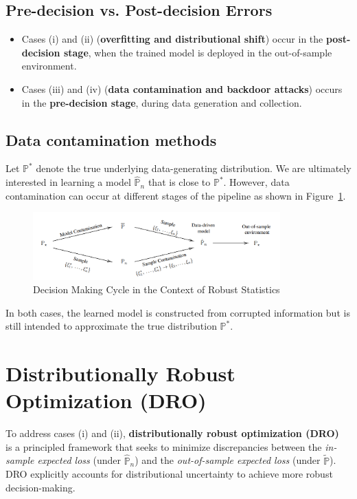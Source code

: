 \documentclass[11pt]{report}
\begin{document}
\subsection{Pre-decision vs. Post-decision Errors}
\begin{itemize}[left=1em]
    \item Cases (i) and (ii) (\textbf{overfitting and distributional shift}) occur in the \textbf{post-decision stage}, when the trained model is deployed in the out-of-sample environment.
    \item Cases (iii) and (iv) (\textbf{data contamination and backdoor attacks}) occurs in the \textbf{pre-decision stage}, during data generation and collection.
\end{itemize}

\subsection{Data contamination methods}
Let $\mathbb{P}^*$ denote the true underlying data-generating distribution. We are ultimately interested in learning a model $\hat{\mathbb{P}}_n$ that is close to $\mathbb{P}^*$. However, data contamination can occur at different stages of the pipeline as shown in Figure~\ref{fig2}.
\begin{figure}[h]
    \centering
    \includegraphics[width=0.85\textwidth]{images/img2.png}
    \caption{Decision Making Cycle in the Context of Robust Statistics}
    \label{fig2}
\end{figure}
In both cases, the learned model is constructed from corrupted information but is still intended to approximate the true distribution $\mathbb{P}^*$.

\section{Distributionally Robust Optimization (DRO)}
To address cases (i) and (ii), \textbf{distributionally robust optimization (DRO)}~\cite{rahimian2019distributionally} is a principled framework that seeks to minimize discrepancies between the \textit{in-sample expected loss} (under $\hat{\mathbb{P}}_n$) and the \textit{out-of-sample expected loss} (under $\tilde{\mathbb{P}}$). DRO explicitly accounts for distributional uncertainty to achieve more robust decision-making.
\end{document}
